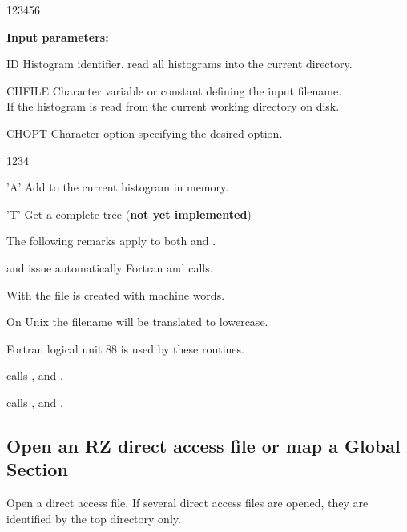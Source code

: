 \newpage\begin{DLtt}{123456}
\item[{\rm\bf Input parameters:}]
\item[ID] Histogram identifier.
           read all histograms into the current directory.
\item[CHFILE]
          Character variable or constant defining the input filename.\\
          If  the histogram is read from the
          current working directory on disk.
\item[CHOPT]
          Character option specifying the desired option.
          \begin{DLtt}{1234}
              \item['A'] Add to the current histogram in memory.
              \item['T'] Get a complete tree (\textbf{not yet implemented})
          \end{DLtt}
\end{DLtt}
 
\Remarks

The following remarks apply to both  and .

\begin{UL}
\item {} and  issue automatically Fortran  and
       calls. 
\item With  the file is created with  machine words.  
\item On Unix the filename  will be translated to lowercase.
\item Fortran logical unit 88 is used by these routines.
\item {} calls ,  and .
\item {} calls ,  and .
\end{UL}
 
\subsection*{Open an RZ direct access file or map a Global Section}
 
 
\Action
Open a direct access \HBOOK{} file.  If several direct access files are opened,
they are identified by the top directory only.
 
